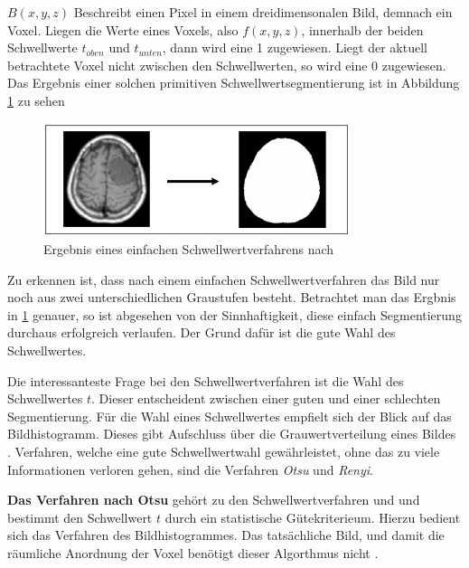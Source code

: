 $B(x, y, z)$ Beschreibt einen Pixel in einem dreidimensonalen Bild, demnach ein Voxel.
Liegen die Werte eines Voxels, also $f(x, y, z)$, innerhalb der beiden
Schwellwerte $t_{oben}$ und $t_{unten}$, dann wird eine 1 zugewiesen. Liegt der
aktuell betrachtete Voxel nicht zwischen den Schwellwerten, so wird eine 0 zugewiesen.
Das Ergebnis einer solchen primitiven Schwellwertsegmentierung ist in Abbildung
\ref{fig:binäres_schwellwertverfahren} zu sehen

\begin{figure}[h]
	\centering
	\includegraphics[width=0.8\textwidth]{img/beispiel_schwellwertverfahren.jpg}
	\caption{Ergebnis eines einfachen Schwellwertverfahrens nach \citet[Seite 96]{handels2000}}
	\label{fig:binäres_schwellwertverfahren}
\end{figure}

Zu erkennen ist, dass nach einem einfachen Schwellwertverfahren das Bild nur noch
aus zwei unterschiedlichen Graustufen besteht. Betrachtet man das Ergbnis in
\ref{fig:binäres_schwellwertverfahren} genauer, so ist abgesehen von der Sinnhaftigkeit,
diese einfach Segmentierung durchaus erfolgreich verlaufen. Der Grund dafür ist die
gute Wahl des Schwellwertes.

Die interessanteste Frage bei den Schwellwertverfahren ist die Wahl des Schwellwertes
$t$. Dieser entscheident zwischen einer guten und einer schlechten Segmentierung.
Für die Wahl eines Schwellwertes empfielt sich der Blick auf das Bildhistogramm.
Dieses gibt Aufschluss über die Grauwertverteilung eines Bildes \citep[vgl.][Seite361]{lehmann2013bildverarbeitung}.
Verfahren, welche eine gute Schwellwertwahl gewährleistet, ohne das zu viele Informationen
verloren gehen, sind die Verfahren \textit{Otsu} und \textit{Renyi}.

\pagebreak

\textbf{Das Verfahren nach Otsu} gehört zu den Schwellwertverfahren und und
bestimmt den Schwellwert $t$ durch ein statistische Gütekriterieum. Hierzu bedient
sich das Verfahren des Bildhistogrammes. Das tatsächliche Bild, und damit die räumliche
Anordnung der Voxel benötigt dieser Algorthmus nicht \citep[vgl.][Seite 264]{lehmann2013bildverarbeitung}.

